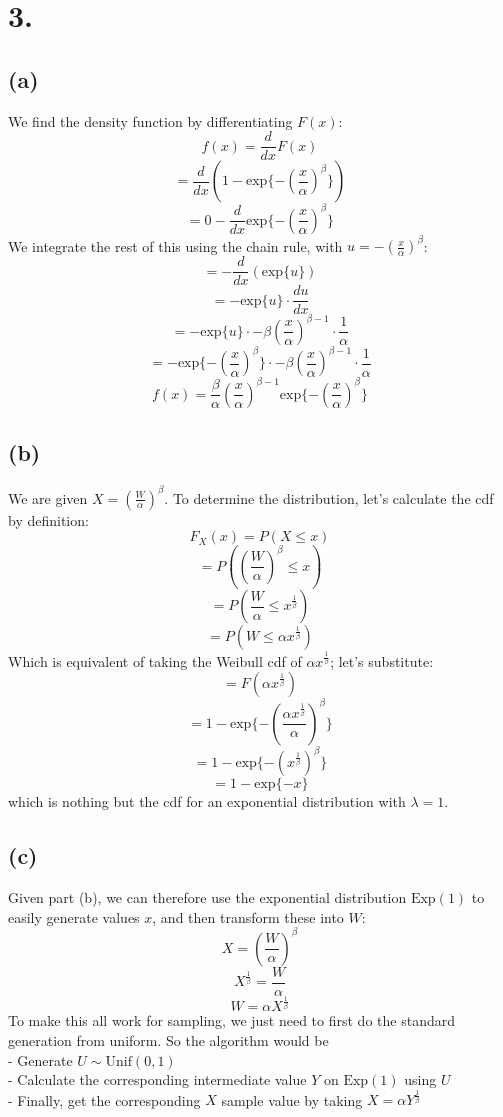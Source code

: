 \documentclass{article}
\begin{document}
{\Large 

\section*{3.}

\subsection*{(a)} 

We find the density function by differentiating \(F(x)\):
\[
  f(x) = \frac{d}{dx} F(x)
\]
\[
  = \frac{d}{dx} (1 - \text{exp}\{- (\frac{x}{\alpha})^\beta\})
\]
\[
  = 0 - \frac{d}{dx} \text{exp}\{- (\frac{x}{\alpha})^\beta\}
\]
We integrate the rest of this using the chain rule, with \(u = - (\frac{x}{\alpha})^\beta\):
\[
  = - \frac{d}{dx} (\text{exp}\{u\})
\]
\[
  = - \text{exp}\{u\} \cdot \frac{du}{dx}
\]
\[
  = - \text{exp}\{u\} \cdot -\beta(\frac{x}{\alpha})^{\beta - 1} \cdot \frac{1}{\alpha}
\]
\[
  = - \text{exp}\{-(\frac{x}{\alpha})^\beta\} \cdot -\beta(\frac{x}{\alpha})^{\beta - 1} \cdot \frac{1}{\alpha}
\]
\[
  f(x) = \boxed{\frac{\beta}{\alpha} (\frac{x}{\alpha})^{\beta - 1} \text{exp}\{-(\frac{x}{\alpha})^\beta\}}
\]

\subsection*{(b)}

We are given \(X = (\frac{W}{\alpha})^\beta\). To determine the distribution, let's calculate the cdf by definition:
\[
  F_X(x) = P(X \leq x)
\]
\[
  = P((\frac{W}{\alpha})^\beta \leq x)
\]
\[
  = P(\frac{W}{\alpha} \leq x^{\frac{1}{\beta}})
\]
\[
  = P(W \leq \alpha x^{\frac{1}{\beta}})
\]
Which is equivalent of taking the Weibull cdf of \(\alpha x^{\frac{1}{\beta}}\); let's substitute:
\[
  = F(\alpha x^{\frac{1}{\beta}})
\]
\[
  = 1 - \text{exp}\{- (\frac{\alpha x^{\frac{1}{\beta}}}{\alpha})^\beta\}
\]
\[
  = 1 - \text{exp}\{- (x^{\frac{1}{\beta}})^\beta\}
\]
\[
  = 1 - \text{exp}\{-x\}
\]
which is nothing but the cdf for an exponential distribution with \(\lambda = 1\).

\subsection*{(c)}

Given part (b), we can therefore use the exponential distribution \(\text{Exp}(1)\) to easily generate values \(x\), and then transform these into \(W\):
\[
  X = (\frac{W}{\alpha})^\beta
\]
\[
  X^\frac{1}{\beta} = \frac{W}{\alpha}
\]
\[
  W = \alpha X^\frac{1}{\beta}
\]
To make this all work for sampling, we just need to first do the standard generation from uniform. So the algorithm would be \\ 
- Generate \(U \sim \text{Unif}(0,1)\) \\
- Calculate the corresponding intermediate value \(Y\) on \(\text{Exp}(1)\) using \(U\) \\
- Finally, get the corresponding \(X\) sample value by taking \(X = \alpha Y ^ \frac{1}{\beta}\)

}
\end{document}

